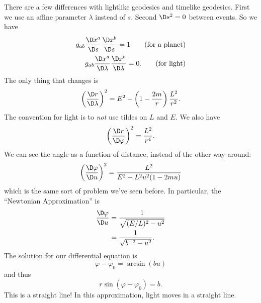 There are a few differences with lightlike geodesics and timelike
geodesics. First we use an affine parameter $\lambda$ instead of
$s$. Second $\D s^{2}=0$ between events. So we have
\begin{align*}
g_{ab}\frac{\D x^{a}}{\D s}\frac{\D x^{b}}{\D s}=1
\tag{\text{for a planet}}\\
g_{ab}\frac{\D x^{a}}{\D\lambda}\frac{\D x^{b}}{\D\lambda}=0.
\tag{\text{for light}}
\end{align*}
The only thing that changes is
\begin{equation}
\left(\frac{\D r}{\D\lambda}\right)^{2}=
E^{2}-\left(1-\frac{2m}{r}\right)\frac{L^{2}}{r^{2}}.
\end{equation}
The convention for light is to \emph{not} use tildes on $L$ and
$E$. We also have
\begin{equation}
\left(\frac{\D r}{\D\varphi}\right)^{2}=\frac{L^{2}}{r^{4}}.
\end{equation}
We can see the angle as a function of distance, instead of the
other way around:
\begin{equation}
\left(\frac{\D\varphi}{\D u}\right)^{2}=
\frac{L^{2}}{E^{2}-L^{2}u^{2}(1-2mu)}
\end{equation}
which is the same sort of problem we've seen before. In
particular, the ``Newtonian Approximation''
is
\begin{equation}
\begin{split}
\frac{\D\varphi}{\D u} 
&=\frac{1}{\sqrt{(E/L)^{2}-u^{2}}}\\
&=\frac{1}{\sqrt{b^{-2}-u^{2}}}.
\end{split}
\end{equation}
The solution for our differential equation is
\begin{equation}
\varphi-\varphi_{0}=\arcsin(bu)
\end{equation}
and thus
\begin{equation}
r\sin(\varphi-\varphi_{0})=b.
\end{equation}
This is a straight line! In this approximation, light moves in a
straight line.

